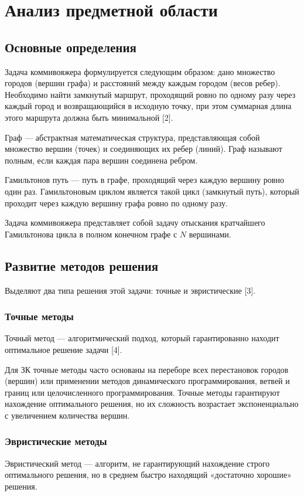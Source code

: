 \chapter{Анализ предметной области}

\section{Основные определения}

Задача коммивояжера формулируется следующим образом: дано множество городов (вершин графа) и расстояний между каждым городом (весов ребер). Необходимо найти замкнутый маршрут, проходящий ровно по одному разу через каждый город и возвращающийся в исходную точку, при этом суммарная длина этого маршрута должна быть минимальной [2].

Граф --- абстрактная математическая структура, представляющая собой множество вершин (точек) и соединяющих их ребер (линий). Граф называют полным, если каждая пара вершин соединена ребром.

Гамильтонов путь --- путь в графе, проходящий через каждую вершину ровно один раз. Гамильтоновым циклом является такой цикл (замкнутый путь), который проходит через каждую вершину графа ровно по одному разу.

Задача коммивояжера представляет собой задачу отыскания кратчайшего Гамильтонова цикла в полном конечном графе с $N$ вершинами. 

\section{Развитие методов решения}

Выделяют два типа решения этой задачи: точные и эвристические [3].

\subsection{Точные методы}
Точный метод --- алгоритмический подход, который гарантированно находит оптимальное решение задачи [4].

Для ЗК точные методы часто основаны на переборе всех перестановок городов (вершин) или применении методов динамического программирования, ветвей и границ или целочисленного программирования. Точные методы гарантируют нахождение оптимального решения, но их сложность возрастает экспоненциально с увеличением количества вершин.

\subsection{Эвристические методы}
Эвристический метод --- алгоритм, не гарантирующий нахождение строго оптимального решения, но в среднем быстро находящий «достаточно хорошие» решения.

